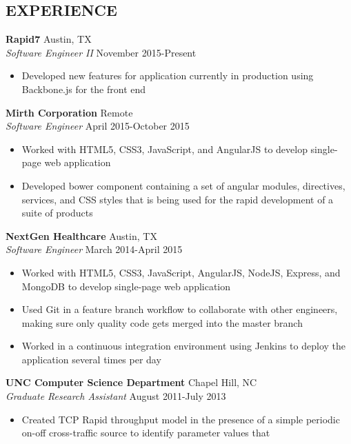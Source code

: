 \documentclass[line,margin,letterpaper]{res}
\begin{document}
\begin{resume}
\section{EXPERIENCE}
  {\bf Rapid7} \hfill Austin, TX \\
  \emph{Software Engineer II} \hfill November 2015-Present
  \begin{itemize} \itemsep -2pt
    \item Developed new features for application currently in production using
    Backbone.js for the front end
  \end{itemize}
  {\bf Mirth Corporation} \hfill Remote \\
  \emph{Software Engineer} \hfill April 2015-October 2015
  \begin{itemize} \itemsep -2pt
    \item Worked with HTML5, CSS3, JavaScript, and AngularJS to develop
    single-page web application
    \item Developed bower component containing a set of angular modules,
    directives, services, and CSS styles that is being used for the rapid
    development of a suite of products
  \end{itemize}
  {\bf NextGen Healthcare} \hfill Austin, TX \\
  \emph{Software Engineer} \hfill March 2014-April 2015
  \begin{itemize} \itemsep -2pt
    \item Worked with HTML5, CSS3, JavaScript, AngularJS, NodeJS, Express, and
    MongoDB to develop single-page web application
    \item Used Git in a feature branch workflow to collaborate with other
    engineers, making sure only quality code gets merged into the master branch
    \item Worked in a continuous integration environment using Jenkins to
    deploy the application several times per day
  \end{itemize}
  {\bf UNC Computer Science Department} \hfill Chapel Hill, NC \\
  \emph{Graduate Research Assistant} \hfill August 2011-July 2013
  \begin{itemize} \itemsep -2pt
    \item Created TCP Rapid throughput model in the presence of a simple
    periodic on-off cross-traffic source to identify parameter values that

\end{itemize}
\end{resume}
\end{document}
